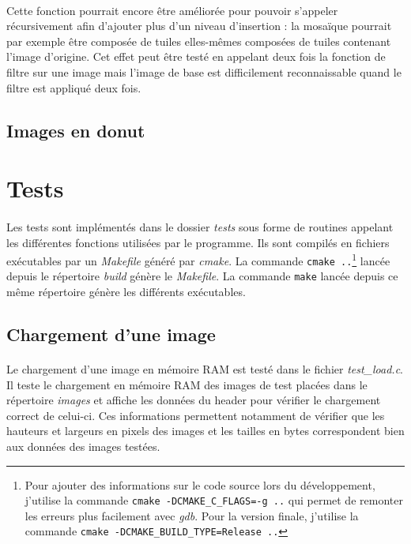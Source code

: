 \documentclass{article}
\begin{document}
    \paragraph{}
    Cette fonction pourrait encore être améliorée pour pouvoir s'appeler récursivement afin d'ajouter plus d'un niveau d'insertion : la mosaïque pourrait par exemple être composée de tuiles elles-mêmes composées de tuiles contenant l'image d'origine. Cet effet peut être testé en appelant deux fois la fonction de filtre sur une image mais l'image de base est difficilement reconnaissable quand le filtre est appliqué deux fois.
    

    \subsection{Images en donut}




    \newpage
    \section{Tests}
    \paragraph{}
    Les tests sont implémentés dans le dossier \emph{tests} sous forme de routines appelant les différentes fonctions utilisées par le programme. Ils sont compilés en fichiers exécutables par un \emph{Makefile} généré par \emph{cmake}. La commande \texttt{cmake ..}\footnote{Pour ajouter des informations sur le code source lors du développement, j'utilise la commande \texttt{cmake -DCMAKE\_C\_FLAGS=-g ..} qui permet de remonter les erreurs plus facilement avec \emph{gdb}. Pour la version finale, j'utilise la commande \texttt{cmake -DCMAKE\_BUILD\_TYPE=Release ..}} lancée depuis le répertoire \emph{build} génère le \emph{Makefile}. La commande \texttt{make} lancée depuis ce même répertoire génère les différents exécutables.


    \subsection{Chargement d'une image}
    \paragraph{}
    Le chargement d'une image en mémoire RAM est testé dans le fichier \emph{test\_load.c}. Il teste le chargement en mémoire RAM des images de test placées dans le répertoire \emph{images} et affiche les données du header pour vérifier le chargement correct de celui-ci. Ces informations permettent notamment de vérifier que les hauteurs et largeurs en pixels des images et les tailles en bytes correspondent bien aux données des images testées.
\end{document}
